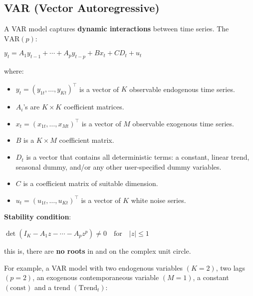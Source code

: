 \documentclass[10pt, a4paper, landscape]{article}
\newcommand{\trend}{\text{Trend}_{t}}
\newcommand{\const}{\text{const}}
\begin{document}
\begin{multicols}{2}

\section*{VAR (Vector Autoregressive)}

A VAR model captures \textbf{dynamic interactions} between time series. The \( \text{VAR}(p) \):

\begin{center}
	\( y_{t} = A_{1} y_{t - 1} + \cdots + A_{p} y_{t - p} + B x_{t} + CD_{t} + u_{t} \)
\end{center}

where:

\begin{itemize}[leftmargin=*]
	\item \( y_{t} = (y_{1t}, \ldots, y_{Kt})^{\top} \) is a vector of \( K \) observable endogenous time series.
	\item \( A_{i} \)'s are \( K \times K \) coefficient matrices.
	\item \( x_{t} = (x_{1t}, \ldots, x_{Mt})^{\top} \) is a vector of \( M \) observable exogenous time series.
	\item \( B \) is a \( K \times M \) coefficient matrix.
	\item \( D_{t} \) is a vector that contains all deterministic terms: a constant, linear trend, seasonal dummy, and/or any other user-specified dummy variables.
	\item \( C \) is a coefficient matrix of suitable dimension.
	\item \( u_{t} = (u_{1t}, \ldots, u_{Kt})^{\top} \) is a vector of \( K \) white noise series.
\end{itemize}

\textbf{Stability condition}:

\begin{center}
	\( \det(I_{K} - A_{1} z - \cdots - A_{p} z^{p}) \neq 0 \quad \text{for}\quad \lvert z \rvert \leq 1 \)
\end{center}

\quad this is, there are \textbf{no roots} in and on the complex unit circle.

For example, a VAR model with two endogenous variables \( (K = 2) \), two lags \( (p = 2) \), an exogenous contemporaneous variable \( (M = 1) \), a constant \( (\const) \) and a trend \( (\trend) \):


\end{multicols}
\end{document}
